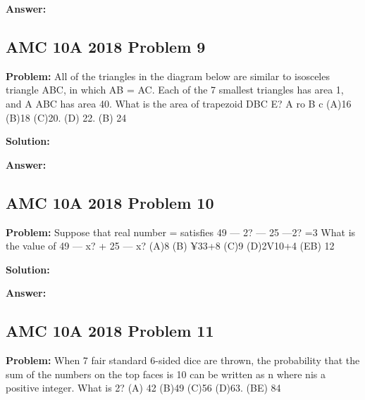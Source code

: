 \documentclass{article}
\newenvironment{problem}{\textbf{Problem: }}{\\}
\newenvironment{solution}{\textbf{Solution: }}{\\}
\newenvironment{answer}{\textbf{Answer: }}{\\}
\begin{document}
\begin{answer}
\end{answer}

\subsection{AMC 10A 2018 Problem 9}

\begin{problem}
All of the triangles in the diagram below are similar to isosceles triangle ABC, in which AB = AC. Each of the 7 smallest triangles has area 1, and A ABC has area 40. What is the area of trapezoid DBC E? A ro B c (A)16 (B)18 (C)20. (D) 22. (B) 24
\end{problem}

\begin{solution}
\end{solution}

\begin{answer}
\end{answer}

\subsection{AMC 10A 2018 Problem 10}

\begin{problem}
Suppose that real number = satisfies 49 — 2? — 25 —2? =3 What is the value of 49 — x? + 25 — x? (A)8 (B) ¥33+8 (C)9 (D)2V10+4 (EB) 12
\end{problem}

\begin{solution}
\end{solution}

\begin{answer}
\end{answer}

\subsection{AMC 10A 2018 Problem 11}

\begin{problem}
When 7 fair standard 6-sided dice are thrown, the probability that the sum of the numbers on the top faces is 10 can be written as n where nis a positive integer. What is 2? (A) 42 (B)49 (C)56 (D)63. (BE) 84
\end{problem}
\end{document}
